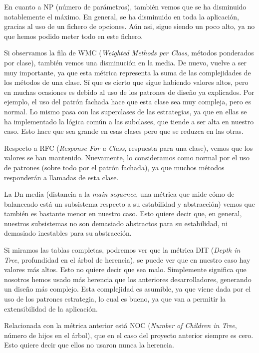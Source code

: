En cuanto a NP (número de parámetros), también vemos que se ha disminuido notablemente el máximo. En general, se ha disminuido en toda la aplicación, gracias al uso de un fichero de opciones. Aún asi, sigue siendo un poco alto, ya no que hemos podido meter todo en este fichero.

Si observamos la fila de WMC (\textit{Weighted Methods per Class}, métodos ponderados por clase), también vemos una disminución en la media. De nuevo, vuelve a ser muy importante, ya que esta métrica representa la suma de las complejidades de los métodos de una clase. Sí que es cierto que sigue habiendo valores altos, pero en muchas ocasiones es debido al uso de los patrones de diseño ya explicados. Por ejemplo, el uso del patrón fachada hace que esta clase sea muy compleja, pero es normal. Lo mismo pasa con las superclases de las estrategias, ya que en ellas se ha implementado la lógica común a las subclases, que tiende a ser alta en nuestro caso. Esto hace que sea grande en esas clases pero que se reduzca en las otras.

Respecto a RFC (\textit{Response For a Class}, respuesta para una clase), vemos que los valores se han mantenido. Nuevamente, lo consideramos como normal por el uso de patrones (sobre todo por el patrón fachada), ya que muchos métodos responderán a llamadas de esta clase.

La Dn media (distancia a la \textit{main sequence}, una métrica que mide cómo de balanceado está un subsistema respecto a su estabilidad y abstracción) vemos que también es bastante menor en nuestro caso. Esto quiere decir que, en general, nuestros subsistemas no son demasiado abstractos para su estabilidad, ni demasiado inestables para su abstracción.

Si miramos las tablas completas, podremos ver que la métrica DIT (\textit{Depth in Tree}, profundidad en el árbol de herencia), se puede ver que en nuestro caso hay valores más altos. Esto no quiere decir que sea malo. Simplemente significa que nosotros hemos usado más herencia que los anteriores desarrolladores, generando un diseño más complejo. Esta complejidad es asumible, ya que viene dada por el uso de los patrones estrategia, lo cual es bueno, ya que van a permitir la extensibilidad de la aplicación.

Relacionada con la métrica anterior está NOC (\textit{Number of Children in Tree}, número de hijos en el árbol), que en el caso del proyecto anterior siempre es cero. Esto quiere decir que ellos no usaron nunca la herencia.

